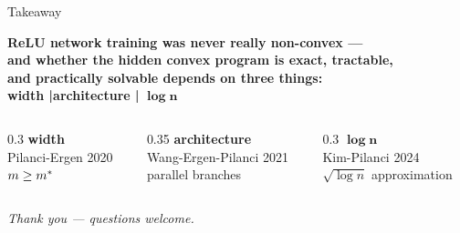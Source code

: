 
%
%
%
%
%
\begin{frame}{Takeaway}

  \vspace{0.5em}
  \begin{center}
    \large\textbf{%
      ReLU network training was never really non-convex ---\\[4pt]
      and whether the hidden convex program is exact, tractable,\\
      and practically solvable depends on three things:
    }\\[0.8em]
    \Large\textbf{width \quad|\quad architecture \quad|\quad} {\Large$\bm{\log n}$}
  \end{center}

  \vspace{0.8em}
  \begin{columns}[t]
    \begin{column}{0.3\textwidth}
      \centering
      \textbf{width}\\
      \small Pilanci-Ergen 2020\\
      $m \geq m^*$
    \end{column}
    \begin{column}{0.35\textwidth}
      \centering
      \textbf{architecture}\\
      \small Wang-Ergen-Pilanci 2021\\
      parallel branches
    \end{column}
    \begin{column}{0.3\textwidth}
      \centering
      \textbf{$\bm{\log n}$}\\
      \small Kim-Pilanci 2024\\
      $\sqrt{\log n}$ approximation
    \end{column}
  \end{columns}

  \vspace{0.8em}
  \begin{center}
    \textit{Thank you --- questions welcome.}
  \end{center}
\end{frame}


